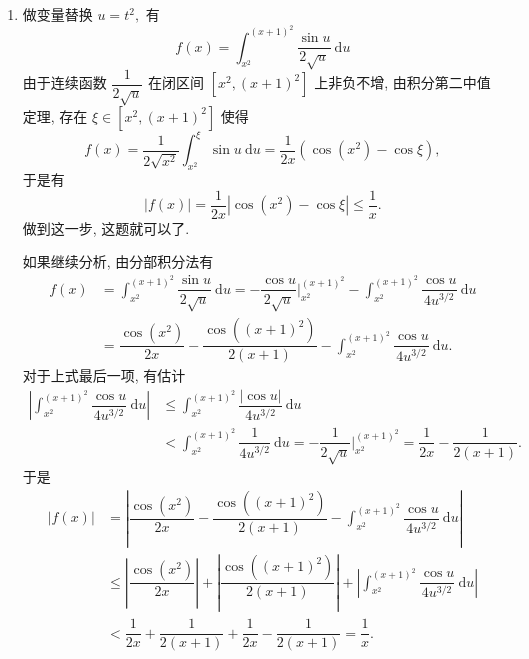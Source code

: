\begin{solution}
\begin{enumerate}
\item 做变量替换 $u = t^2,$ 有
\begin{equation*}
f(x) = \int_{x^2}^{(x+1)^2} \dfrac{\sin u}{2\sqrt{u}} ~ \mathrm{d} u
\end{equation*}
由于连续函数 $\dfrac{1}{2\sqrt{u}}$ 在闭区间 $[x^2, (x+1)^2]$ 上非负不增, 由积分第二中值定理, 存在 $\xi \in [x^2, (x+1)^2]$ 使得
\begin{equation*}
f(x) = \dfrac{1}{2\sqrt{x^2}} \int_{x^2}^{\xi} \sin u ~ \mathrm{d} u = \dfrac{1}{2x} ( \cos (x^2) - \cos \xi),
\end{equation*}
于是有
\begin{equation*}
| f(x) | = \dfrac{1}{2x} | \cos (x^2) - \cos \xi| \leqslant \dfrac{1}{x}.
\end{equation*}
做到这一步, 这题就可以了.

如果继续分析, 由分部积分法有
\begin{align*}
f(x) & = \int_{x^2}^{(x+1)^2} \dfrac{\sin u}{2\sqrt{u}} ~ \mathrm{d} u = -\dfrac{\cos u}{2\sqrt{u}} \bigg|_{x^2}^{(x+1)^2} - \int_{x^2}^{(x+1)^2} \dfrac{\cos u}{4 u^{3/2}} ~ \mathrm{d} u \\
& = \dfrac{\cos(x^2)}{2x} - \dfrac{\cos((x+1)^2)}{2(x+1)} - \int_{x^2}^{(x+1)^2} \dfrac{\cos u}{4 u^{3/2}} ~ \mathrm{d} u.
\end{align*}
对于上式最后一项, 有估计
\begin{align*}
\left\lvert \int_{x^2}^{(x+1)^2} \dfrac{\cos u}{4 u^{3/2}} ~ \mathrm{d} u \right\rvert & \leqslant \int_{x^2}^{(x+1)^2} \dfrac{|\cos u|}{4 u^{3/2}} ~ \mathrm{d} u \\
& < \int_{x^2}^{(x+1)^2} \dfrac{1}{4 u^{3/2}} ~ \mathrm{d} u = -\dfrac{1}{2\sqrt{u}} \bigg|_{x^2}^{(x+1)^2} = \dfrac{1}{2x} - \dfrac{1}{2(x+1)}.
\end{align*}
于是
\begin{align*}
| f(x) | & = \left\lvert \dfrac{\cos(x^2)}{2x} - \dfrac{\cos((x+1)^2)}{2(x+1)} - \int_{x^2}^{(x+1)^2} \dfrac{\cos u}{4 u^{3/2}} ~ \mathrm{d} u \right\rvert \\
& \leqslant \left\lvert \dfrac{\cos(x^2)}{2x} \right\rvert + \left\lvert \dfrac{\cos((x+1)^2)}{2(x+1)} \right\rvert + \left\rvert \int_{x^2}^{(x+1)^2} \dfrac{\cos u}{4 u^{3/2}} ~ \mathrm{d} u \right\rvert \\
& < \dfrac{1}{2x} + \dfrac{1}{2(x+1)} + \dfrac{1}{2x} - \dfrac{1}{2(x+1)} = \dfrac{1}{x}.
\end{align*}


\end{enumerate}
\end{solution}
